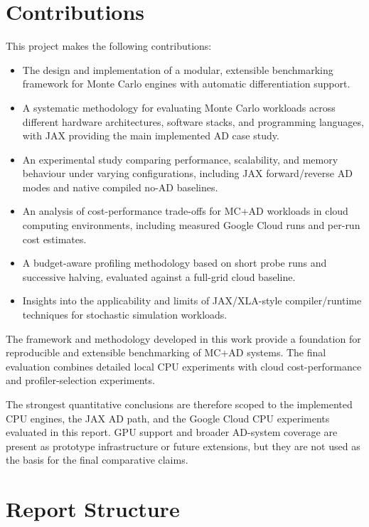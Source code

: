 \section{Contributions}

This project makes the following contributions:

\begin{itemize}

    \item The design and implementation of a modular, extensible benchmarking framework for Monte Carlo engines with automatic differentiation support.
    \item A systematic methodology for evaluating Monte Carlo workloads across different hardware architectures, software stacks, and programming languages, with JAX providing the main implemented AD case study.
    \item An experimental study comparing performance, scalability, and memory behaviour under varying configurations, including JAX forward/reverse AD modes and native compiled no-AD baselines.
    \item An analysis of cost-performance trade-offs for MC+AD workloads in cloud computing environments, including measured Google Cloud runs and per-run cost estimates.
    \item A budget-aware profiling methodology based on short probe runs and successive halving, evaluated against a full-grid cloud baseline.
    \item Insights into the applicability and limits of JAX/XLA-style compiler/runtime techniques for stochastic simulation workloads.
    
\end{itemize}

The framework and methodology developed in this work provide a foundation for reproducible and extensible benchmarking of MC+AD systems. The final evaluation combines detailed local CPU experiments with cloud cost-performance and profiler-selection experiments.

The strongest quantitative conclusions are therefore scoped to the implemented
CPU engines, the JAX AD path, and the Google Cloud CPU experiments evaluated in
this report. GPU support and broader AD-system coverage are present as
prototype infrastructure or future extensions, but they are not used as the
basis for the final comparative claims.

\section{Report Structure}

